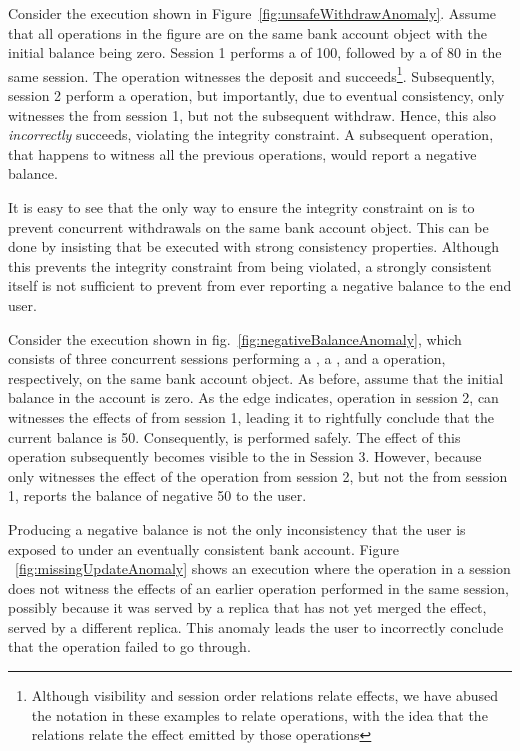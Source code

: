 Consider the execution shown in Figure~\ref{fig:unsafeWithdrawAnomaly}. Assume
that all operations in the figure are on the same bank account object with the
initial balance being zero. Session 1 performs a  of 100, followed
by a  of 80 in the same session. The  operation
witnesses the deposit and succeeds\footnote{Although visibility and session
order relations relate effects, we have abused the notation in these examples
to relate operations, with the idea that the relations relate the effect
emitted by those operations}. Subsequently, session 2 perform a 
operation, but importantly, due to eventual consistency, only witnesses the
 from session 1, but not the subsequent withdraw. Hence, this
 also \emph{incorrectly} succeeds, violating the integrity
constraint. A subsequent  operation, that happens to witness all
the previous operations,  would report a negative balance.

It is easy to see that the only way to ensure the integrity constraint on
 is to prevent concurrent withdrawals on the same bank account
object. This can be done by insisting that  be executed with
strong consistency properties. Although this prevents the integrity constraint
from being violated, a strongly consistent  itself is not
sufficient to prevent  from ever reporting a negative balance to
the end user.

Consider the execution shown in fig.~\ref{fig:negativeBalanceAnomaly}, which
consists of three concurrent sessions performing a , a
, and a  operation, respectively, on the same bank
account object. As before, assume that the initial balance in the account is
zero. As the  edge indicates, operation  in session 2,
can witnesses the effects of  from session 1, leading it to
rightfully conclude that the current balance is 50. Consequently,
 is performed safely. The effect of this 
operation subsequently becomes visible to the  in Session 3.
However, because  only witnesses the effect of the 
operation from session 2, but not the  from session 1, reports the
balance of negative 50 to the user.

Producing a negative balance is not the only inconsistency that the user is
exposed to under an eventually consistent bank account. Figure
~\ref{fig:missingUpdateAnomaly} shows an execution where the 
operation in a session does not witness the effects of an earlier 
operation performed in the same session, possibly because it was served by a
replica that has not yet merged the  effect, served by a different
replica. This anomaly leads the user to incorrectly conclude that the
 operation failed to go through.

